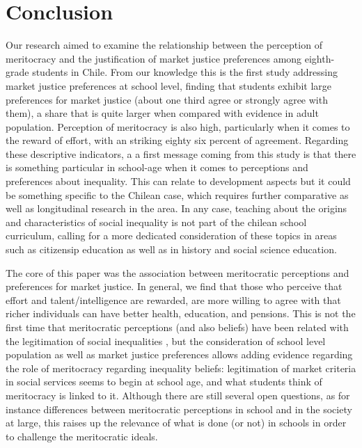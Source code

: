 \documentclass[
    behavsci,
    article,
    submit,
moreauthors
]{mdpi}
\begin{document}
\section{Conclusion}\label{conclusion}

Our research aimed to examine the relationship between the perception of
meritocracy and the justification of market justice preferences among
eighth-grade students in Chile. From our knowledge this is the first
study addressing market justice preferences at school level, finding
that students exhibit large preferences for market justice (about one
third agree or strongly agree with them), a share that is quite larger
when compared with evidence in adult population. Perception of
meritocracy is also high, particularly when it comes to the reward of
effort, with an striking eighty six percent of agreement. Regarding
these descriptive indicators, a a first message coming from this study
is that there is something particular in school-age when it comes to
perceptions and preferences about inequality. This can relate to
development aspects
\citep[\citet{rizzo_children_2020}]{kim_socioeconomic_2020} but it could
be something specific to the Chilean case, which requires further
comparative as well as longitudinal research in the area. In any case,
teaching about the origins and characteristics of social inequality is
not part of the chilean school curriculum, calling for a more dedicated
consideration of these topics in areas such as citizensip education as
well as in history and social science education.

The core of this paper was the association between meritocratic
perceptions and preferences for market justice. In general, we find that
those who perceive that effort and talent/intelligence are rewarded, are
more willing to agree with that richer individuals can have better
health, education, and pensions. This is not the first time that
meritocratic perceptions (and also beliefs) have been related with the
legitimation of social inequalities
\citep{mijs_paradox_2019, darnon_where_2018}, but the consideration of
school level population as well as market justice preferences allows
adding evidence regarding the role of meritocracy regarding inequality
beliefs: legitimation of market criteria in social services seems to
begin at school age, and what students think of meritocracy is linked to
it. Although there are still several open questions, as for instance
differences between meritocratic perceptions in school and in the
society at large, this raises up the relevance of what is done (or not)
in schools in order to challenge the meritocratic ideals.
\end{document}
